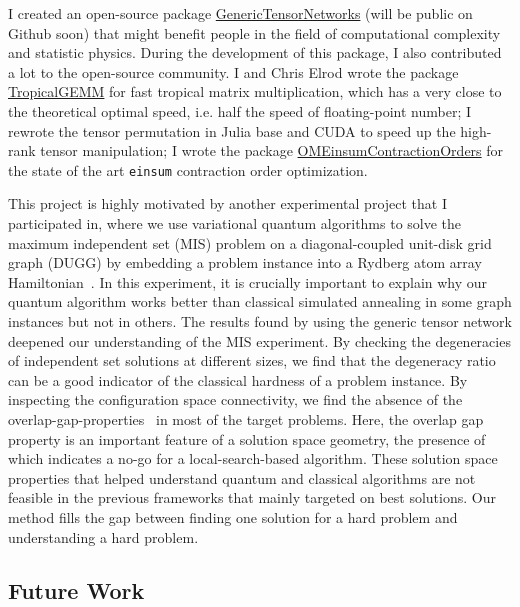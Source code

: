 \documentclass[a4paper]{article}
\newcommand{\<}{\langle}
\renewcommand{\>}{\rangle}
\begin{document}
I created an open-source package \href{https://github.com/QuEraComputing/GenericTensorNetworks.jl}{GenericTensorNetworks} (will be public on Github soon) that might benefit people in the field of computational complexity and statistic physics.
During the development of this package, I also contributed a lot to the open-source community. I and Chris Elrod wrote the package \href{https://github.com/TensorBFS/TropicalGEMM.jl/}{TropicalGEMM} for fast tropical matrix multiplication, which has a very close to the theoretical optimal speed, i.e. half the speed of floating-point number; I rewrote the tensor permutation in Julia base and CUDA to speed up the high-rank tensor manipulation; I wrote the package \href{https://github.com/TensorBFS/OMEinsumContractionOrders.jl}{OMEinsumContractionOrders} for the state of the art \texttt{einsum} contraction order optimization.


This project is highly motivated by another experimental project that I participated in, where we use variational quantum algorithms to solve the maximum independent set (MIS) problem on a diagonal-coupled unit-disk grid graph (DUGG) by embedding a problem instance into a Rydberg atom array Hamiltonian~\cite{Ebadi2022}.
In this experiment, it is crucially important to explain why our quantum algorithm works better than classical simulated annealing in some graph instances but not in others.
The results found by using the generic tensor network deepened our understanding of the MIS experiment.
By checking the degeneracies of independent set solutions at different sizes, we find that the degeneracy ratio can be a good indicator of the classical hardness of a problem instance.
By inspecting the configuration space connectivity, we find the absence of the overlap-gap-properties~\cite{Gamarnik2021} in most of the target problems.
Here, the overlap gap property is an important feature of a solution space geometry, the presence of which indicates a no-go for a local-search-based algorithm.
These solution space properties that helped understand quantum and classical algorithms are not feasible in the previous frameworks that mainly targeted on best solutions. Our method fills the gap between finding one solution for a hard problem and understanding a hard problem.

\subsection{Future Work}
\end{document}
